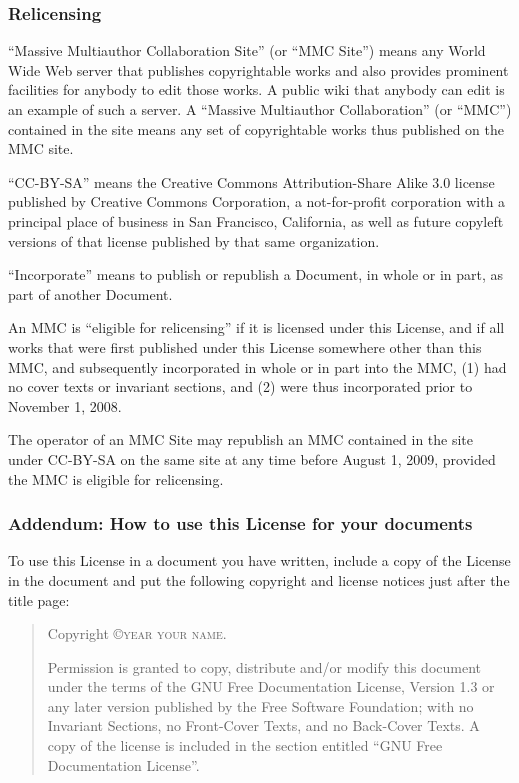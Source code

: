 \subsubsection{Relicensing}

``Massive Multiauthor Collaboration Site'' (or ``MMC Site'') means any World Wide Web server that publishes copyrightable works and also provides prominent facilities for anybody to edit those works. A public wiki that anybody can edit is an example of such a server. A ``Massive Multiauthor Collaboration'' (or ``MMC'') contained in the site means any set of copyrightable works thus published on the MMC site.

``CC-BY-SA'' means the Creative Commons Attribution-Share Alike 3.0 license published by Creative Commons Corporation, a not-for-profit corporation with a principal place of business in San Francisco, California, as well as future copyleft versions of that license published by that same organization.

``Incorporate'' means to publish or republish a Document, in whole or in part, as part of another Document.

An MMC is ``eligible for relicensing'' if it is licensed under this License, and if all works that were first published under this License somewhere other than this MMC, and subsequently incorporated in whole or in part into the MMC, (1) had no cover texts or invariant sections, and (2) were thus incorporated prior to November 1, 2008.

The operator of an MMC Site may republish an MMC contained in the site under CC-BY-SA on the same site at any time before August 1, 2009, provided the MMC is eligible for relicensing.

\subsubsection{Addendum: How to use this License for your documents}

To use this License in a document you have written, include a copy of the License in the document and put the following copyright and license notices just after the title page:

\bigskip
\begin{quote}
  Copyright \copyright \textsc{year your name}.

  Permission is granted to copy, distribute and/or modify this document under the terms of the GNU Free Documentation License, Version 1.3 or any later version published by the Free Software Foundation; with no Invariant Sections, no Front-Cover Texts, and no Back-Cover Texts. A copy of the license is included in the section entitled ``GNU Free Documentation License''.
\end{quote}
\bigskip

